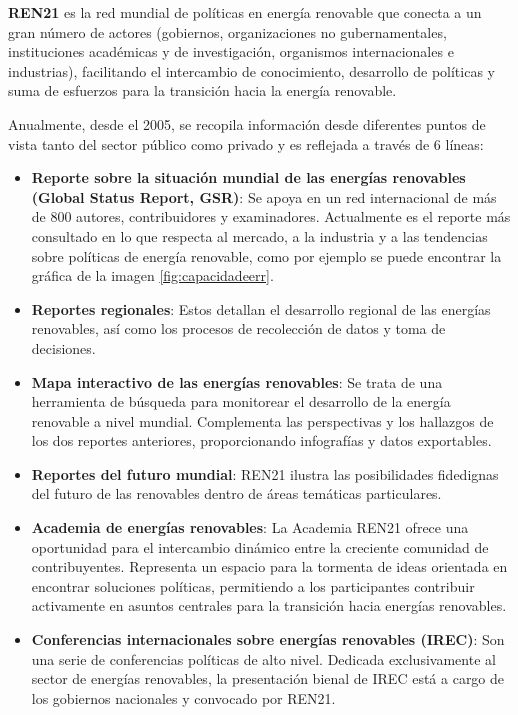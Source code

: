 \textbf{REN21} \cite{ren21} es la red mundial de políticas en energía renovable que
conecta a un gran número de actores (gobiernos, organizaciones no
gubernamentales, instituciones académicas y de investigación, organismos
internacionales e industrias), facilitando el intercambio de
conocimiento, desarrollo de políticas y suma de esfuerzos para la
transición hacia la energía renovable.


Anualmente, desde el 2005, se recopila información desde diferentes
puntos de vista tanto del sector público como privado y es reflejada a
través de 6 líneas:

\begin{itemize}
\item
  \textbf{Reporte sobre la situación mundial de las energías renovables
  (Global Status Report, GSR)}: Se apoya en un red internacional de más
  de 800 autores, contribuidores y examinadores. Actualmente es el
  reporte más consultado en lo que respecta al mercado, a la industria y
  a las tendencias sobre políticas de energía renovable, como por ejemplo se puede encontrar la gráfica de la imagen \autoref{fig:capacidadeerr}.
\item
  \textbf{Reportes regionales}: Estos detallan el desarrollo regional de
  las energías renovables, así como los procesos de recolección de datos
  y toma de decisiones.
\item
  \textbf{Mapa interactivo de las energías renovables}: Se trata de una
  herramienta de búsqueda para monitorear el desarrollo de la energía
  renovable a nivel mundial. Complementa las perspectivas y los
  hallazgos de los dos reportes anteriores, proporcionando infografías y
  datos exportables.
\item
  \textbf{Reportes del futuro mundial}: REN21 ilustra las posibilidades
  fidedignas del futuro de las renovables dentro de áreas temáticas
  particulares.
\item
  \textbf{Academia de energías renovables}: La Academia REN21 ofrece una
  oportunidad para el intercambio dinámico entre la creciente comunidad
  de contribuyentes. Representa un espacio para la tormenta de ideas
  orientada en encontrar soluciones políticas, permitiendo a los
  participantes contribuir activamente en asuntos centrales para la
  transición hacia energías renovables.
\item
  \textbf{Conferencias internacionales sobre energías renovables
  (IREC)}: Son una serie de conferencias políticas de alto nivel.
  Dedicada exclusivamente al sector de energías renovables, la
  presentación bienal de IREC está a cargo de los gobiernos nacionales y
  convocado por REN21.
\end{itemize}

